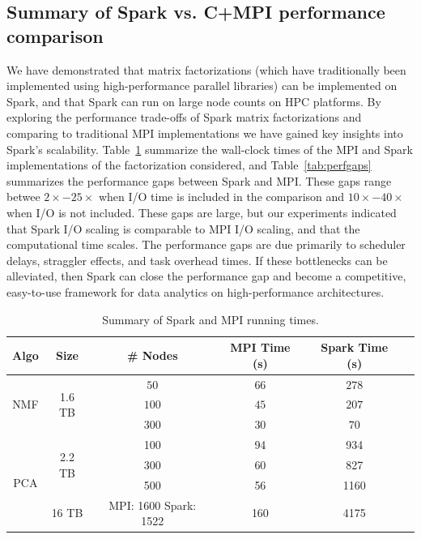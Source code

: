 \subsection{Summary of Spark vs. C+MPI performance comparison}
We have demonstrated that matrix factorizations (which have traditionally been implemented using high-performance parallel libraries) can be implemented on Spark, and that Spark can run on large node counts on HPC platforms. By exploring the performance trade-offs of Spark matrix factorizations and comparing to traditional MPI implementations we have gained key insights into Spark's scalability. Table~\ref{tab:matrix} summarize the wall-clock times of the MPI and Spark implementations of the factorization considered, and Table~\ref{tab:perfgaps} summarizes the performance gaps between Spark and MPI. These gaps range betwee $2\times - 25\times$ when I/O time is included in the comparison and $10\times - 40\times$ when I/O is not included. These gaps are large, but our experiments indicated that Spark I/O scaling is comparable to MPI I/O scaling, and that the computational time scales. The performance gaps are due primarily to scheduler delays, straggler effects, and task overhead times. If these bottlenecks can be alleviated, then Spark can close the performance gap and become a competitive, easy-to-use framework for data analytics on high-performance architectures.

\begin{table}[tbh]
\centering

\begin{tabular}{|c|c|c|c|c|c|} \hline
Algo & Size & \# Nodes & MPI Time (s) & Spark Time (s)\\ \hline
\multirow{3}{*}{NMF} & \multirow{3}{*}{1.6 TB} & $50$ & $66$ & $278$\\
{} & {} & $100$  & $45$ & $207$\\
{} & {} & $300$ & $30$ & $70$\\ \hline
\multirow{4}{*}{PCA} & \multirow{3}{*}{2.2 TB} & 100 & 94 & 934\\
 {} & {} & 300 & 60 & 827\\
 {} & {} & 500 & 56 & 1160\\ \cline{2-5}
 {} & {16 TB} & {MPI: 1600 Spark: 1522} & 160 & 4175 \\ \hline
\end{tabular}
\caption{{Summary of Spark and MPI running times.}}
\label{tab:matrix}
\end{table}

